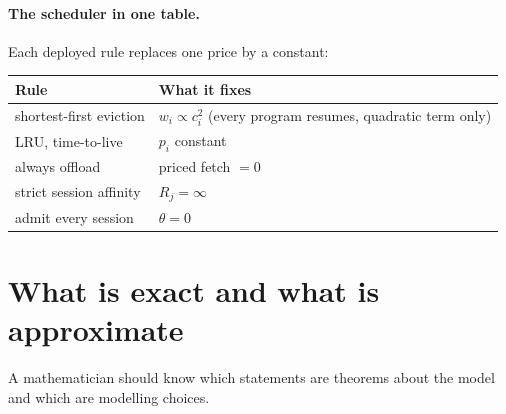 \paragraph{The scheduler in one table.} Each deployed rule replaces one
price by a constant:
\begin{center}\small
\begin{tabular}{@{}ll@{}}
\toprule
Rule & What it fixes \\
\midrule
shortest-first eviction & $w_i\propto c_i^2$ (every program resumes, quadratic term only) \\
LRU, time-to-live & $p_i$ constant \\
always offload & priced fetch $=0$ \\
strict session affinity & $R_j=\infty$ \\
admit every session & $\theta=0$ \\
\bottomrule
\end{tabular}
\end{center}

\section{What is exact and what is approximate}\label{L5:sec:honest}

A mathematician should know which statements are theorems about the model
and which are modelling choices.

